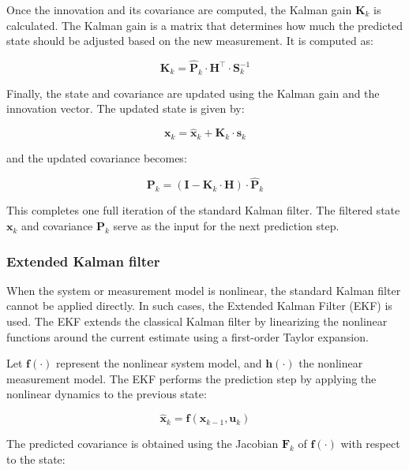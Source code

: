 Once the innovation and its covariance are computed, the Kalman gain $\mathbf{K}_k$ is calculated. The Kalman gain
is a matrix that determines how much the predicted state should be adjusted based on the new measurement. It is computed as:

\begin{equation}
  \mathbf{K}_k = \hat{\mathbf{P}}_k \cdot \mathbf{H}^\top \cdot \mathbf{S}_k^{-1}
\end{equation}

Finally, the state and covariance are updated using the Kalman gain and the innovation vector. The updated state
is given by:

\begin{equation}
  \mathbf{x}_k = \hat{\mathbf{x}}_k + \mathbf{K}_k \cdot \mathbf{s}_k
\end{equation}

and the updated covariance becomes:

\begin{equation}
  \mathbf{P}_k = \left( \mathbf{I} - \mathbf{K}_k \cdot \mathbf{H} \right) \cdot \hat{\mathbf{P}}_k
\end{equation}

This completes one full iteration of the standard Kalman filter. The filtered state $\mathbf{x}_k$ and
covariance $\mathbf{P}_k$ serve as the input for the next prediction step.

\subsubsection{Extended Kalman filter}\label{sec:ExtendedKalmanFilter}

When the system or measurement model is nonlinear, the standard Kalman filter cannot be applied directly.
In such cases, the Extended Kalman Filter (EKF) is used. The \gls{EKF} extends the classical Kalman filter by
linearizing the nonlinear functions around the current estimate using a first-order Taylor expansion.

Let $\mathbf{f}(\cdot)$ represent the nonlinear system model, and $\mathbf{h}(\cdot)$ the nonlinear measurement
model. The \gls{EKF} performs the prediction step by applying the nonlinear dynamics to the previous state:

\begin{equation}
  \hat{\mathbf{x}}_k = \mathbf{f}(\mathbf{x}_{k-1}, \mathbf{u}_k)
\end{equation}

The predicted covariance is obtained using the Jacobian $\mathbf{F}_k$ of $\mathbf{f}(\cdot)$ with respect to
the state:

